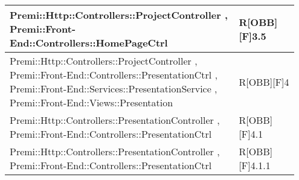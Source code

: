 \begin{table}[h]
\begin{center}
\begin{tabular}{|p{0.75\linewidth}|p{0.2\linewidth}|}
		\midrule
			Premi::Http::Controllers::ProjectController , Premi::Front-End::Controllers::HomePageCtrl & R[OBB][F]3.5 \\
		\midrule
			Premi::Http::Controllers::ProjectController , Premi::Front-End::Controllers::PresentationCtrl , Premi::Front-End::Services::PresentationService , Premi::Front-End::Views::Presentation & R[OBB][F]4 \\
		\midrule
			Premi::Http::Controllers::PresentationController , Premi::Front-End::Controllers::PresentationCtrl & R[OBB][F]4.1 \\
		\midrule
			Premi::Http::Controllers::PresentationController , Premi::Front-End::Controllers::PresentationCtrl & R[OBB][F]4.1.1 \\

\bottomrule
\end{tabular}
\end{center}
\end{table}


